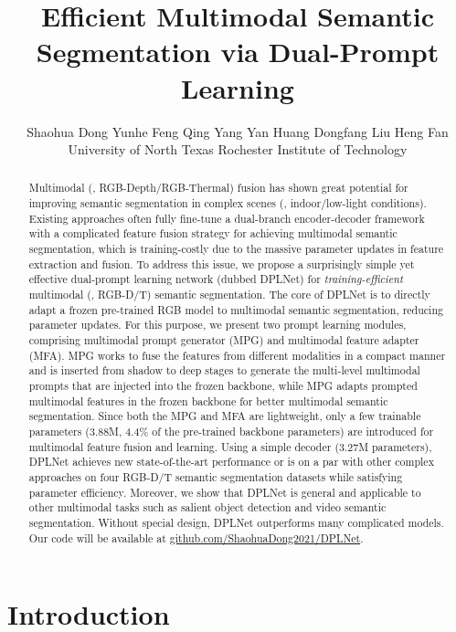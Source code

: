 \documentclass[10pt,twocolumn,letterpaper]{article}
\title{Efficient Multimodal Semantic Segmentation via Dual-Prompt Learning}
\author{Shaohua Dong\;\;\; Yunhe Feng\;\;\;  Qing Yang\;\;\;
Yan Huang\;\;\; Dongfang Liu\;\;\;  Heng Fan\\
University of North Texas \;\;\;\;\;\;\; Rochester Institute of Technology\\
}
\begin{document}
\maketitle

\begin{abstract}

Multimodal (\eg, RGB-Depth/RGB-Thermal) fusion has shown great potential for improving semantic segmentation in complex scenes (\eg, indoor/low-light conditions).
Existing approaches often fully fine-tune a dual-branch encoder-decoder framework with a complicated feature fusion strategy for achieving multimodal semantic segmentation, which is training-costly due to the massive parameter updates in feature extraction and fusion. To address this issue, we propose a surprisingly simple yet effective dual-prompt learning network (dubbed DPLNet) for \emph{training-efficient} multimodal (\eg, RGB-D/T) semantic segmentation. The core of DPLNet is to directly adapt a frozen pre-trained RGB model to multimodal semantic segmentation, reducing parameter updates. For this purpose, we present two prompt learning modules, comprising multimodal prompt generator (MPG) and multimodal feature adapter (MFA). MPG works to fuse the features from different modalities in a compact manner and is inserted from shadow to deep stages to generate the multi-level multimodal prompts that are injected into the frozen backbone, while MPG adapts prompted multimodal features in the frozen backbone for better multimodal semantic segmentation. Since both the MPG and MFA are lightweight, only a few trainable parameters (3.88M, 4.4\% of the pre-trained backbone parameters) are introduced for multimodal feature fusion and learning. Using a simple decoder (3.27M parameters), DPLNet achieves new state-of-the-art performance or is on a par with other complex approaches on four RGB-D/T semantic segmentation datasets while satisfying parameter efficiency. Moreover, we show that DPLNet is general and applicable to other multimodal tasks such as salient object detection and video semantic segmentation. Without special design, DPLNet outperforms many complicated models. Our code will be available at \href{https://github.com/ShaohuaDong2021/DPLNet}{github.com/ShaohuaDong2021/DPLNet}.

\end{abstract}

\section{Introduction}
\label{sec:intro}
\end{document}
